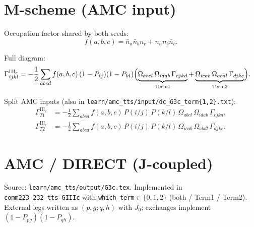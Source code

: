 \documentclass[11pt]{article}
\newcommand{\nbar}{\bar n}
\begin{document}
\section{M-scheme (AMC input)}

Occupation factor shared by both seeds:
\begin{equation}
  f(a,b,c)
  =\nbar_a\nbar_b n_c + n_a n_b\nbar_c.
  \label{eq:occ}
\end{equation}

Full diagram:
\begin{equation}
\begin{aligned}
\Gamma^{\mathrm{III}_c}_{ijkl}
&=-\frac12\sum_{abcd} f(a,b,c)\,(1-P_{ij})(1-P_{kl})
\Bigl(
\underbrace{\Omega_{abcl}\,\Omega_{idab}\,\Gamma_{cjkd}}_{\mathrm{Term1}}
+\underbrace{\Omega_{icab}\,\Omega_{abdl}\,\Gamma_{djkc}}_{\mathrm{Term2}}
\Bigr).
\end{aligned}
\label{eq:mscheme}
\end{equation}

Split AMC inputs (also in \texttt{learn/amc\_tts/input/dc\_G3c\_term\{1,2\}.txt}):
\begin{align}
\Gamma^{\mathrm{III}_c}_{T1}
&=-\frac12\sum_{abcd} f(a,b,c)\,P(i/j)\,P(k/l)\,
\Omega_{abcl}\,\Omega_{idab}\,\Gamma_{cjkd},
\label{eq:ms-t1}\\
\Gamma^{\mathrm{III}_c}_{T2}
&=-\frac12\sum_{abcd} f(a,b,c)\,P(i/j)\,P(k/l)\,
\Omega_{icab}\,\Omega_{abdl}\,\Gamma_{djkc}.
\label{eq:ms-t2}
\end{align}

\section{AMC / DIRECT (J-coupled)}
\label{sec:direct}

Source: \texttt{learn/amc\_tts/output/G3c.tex}.
Implemented in \texttt{comm223\_232\_tts\_GIIIc} with
\texttt{which\_term}$\in\{0,1,2\}$ (both / Term1 / Term2).
External legs written as $(p,g;q,h)$ with $J_0$; exchanges implement $(1-P_{pg})(1-P_{qh})$.
\end{document}
